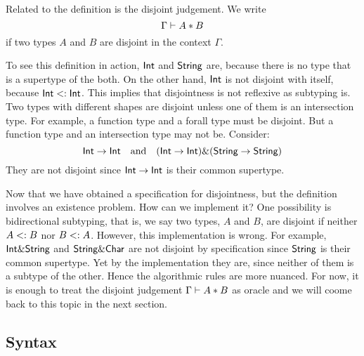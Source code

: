 Related to the definition is the disjoint judgement. We write
\[ \Gamma \vdash A * B \]
if two types $A$ and $B$ are disjoint in the context $\Gamma$.

To see this definition in action, $\textsf{Int}$ and $\textsf{String}$ are, because there is
no type that is a supertype of the both. On the other hand, $\textsf{Int}$ is not
disjoint with itself, because $\textsf{Int} <: \textsf{Int}$. This implies that
disjointness is not reflexive as subtyping is. Two types with different shapes
are disjoint unless one of them is an intersection type. For example, a function
type and a forall type must be disjoint. But a function type and an intersection
type may not be. Consider:
\[ \textsf{Int} \to \textsf{Int} \quad \text{and} \quad (\textsf{Int} \to \textsf{Int}) \& (\textsf{String} \to \textsf{String}) \]
They are not disjoint since $\textsf{Int} \to \textsf{Int}$ is their common supertype.

Now that we have obtained a specification for disjointness, but the definition
involves an existence problem. How can we implement it? One possibility is
bidirectional subtyping, that is, we say two types, $A$ and $B$, are disjoint if
neither $A <: B$ nor $B <: A$. However, this implementation is
wrong. For example, $\textsf{Int} \& \textsf{String}$ and $\textsf{String} \& \textsf{Char}$ are
not disjoint by specification since $\textsf{String}$ is their common supertype. Yet
by the implementation they are, since neither of them is a subtype of
the other. 
Hence the algorithmic rules are more nuanced. For now, it is enough to treat the
disjoint judgement $\Gamma \vdash A * B$ as oracle and we will coome back to
this topic in the next section.

\subsection{Syntax}

